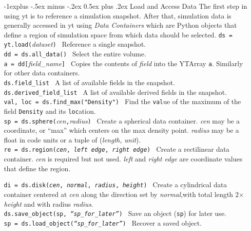 \documentclass[10pt,landscape]{article}
\makeatletter
\renewcommand{\subsection}{\@startsection{subsection}{2}{0mm}%
                                {-1explus -.5ex minus -.2ex}%
                                {0.5ex plus .2ex}%
                                {\normalfont\normalsize\bfseries}}
\makeatother
\begin{document}
\begin{multicols}{3}
\subsection{Load and Access Data}
The first step in using yt is to reference a simulation snapshot.
After that, simulation data is generally accessed in yt using {\it Data Containers} which are Python objects
that define a region of simulation space from which data should be selected.
\texttt{ds = yt.load(}{\it dataset}\texttt{)} \textemdash\   Reference a single snapshot.\\
\texttt{dd = ds.all\_data()} \textemdash\ Select the entire volume.\\
\texttt{a = dd[}{\it field\_name}\texttt{]} \textemdash\ Copies the contents of {\it field} into the
YTArray \texttt{a}. Similarly for other data containers.\\
\texttt{ds.field\_list} \textemdash\ A list of available fields in the snapshot. \\
\texttt{ds.derived\_field\_list} \textemdash\ A list of available derived fields
in the snapshot. \\
\texttt{val, loc = ds.find\_max("Density")} \textemdash\ Find the \texttt{val}ue of
the maximum of the field \texttt{Density} and its \texttt{loc}ation. \\
\texttt{sp = ds.sphere(}{\it cen}\texttt{,}{\it radius}\texttt{)} \textemdash\   Create a spherical data 
container. {\it cen} may be a coordinate, or ``max'' which 
centers on the max density point. {\it radius} may be a float in 
code units or a tuple of ({\it length, unit}).\\

\texttt{re = ds.region({\it cen}, {\it left edge}, {\it right edge})} \textemdash\ Create a
rectilinear data container. {\it cen} is required but not used.
{\it left} and {\it right edge} are coordinate values that define the region.

\texttt{di = ds.disk({\it cen}, {\it normal}, {\it radius}, {\it height})} \textemdash\ 
Create a cylindrical data container centered at {\it cen} along the 
direction set by {\it normal},with total length
 2$\times${\it height} and with radius {\it radius}. \\
 
\texttt{ds.save\_object(sp, {\it ``sp\_for\_later''})} \textemdash\ Save an object (\texttt{sp}) for later use.\\
\texttt{sp = ds.load\_object({\it ``sp\_for\_later''})} \textemdash\ Recover a saved object.\\



\end{multicols}
\end{document}
